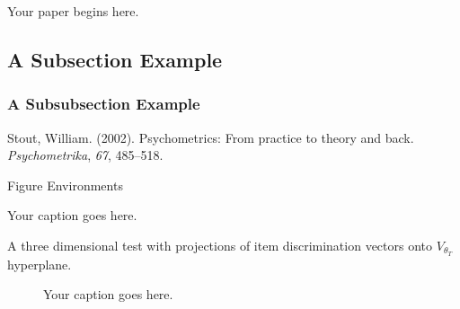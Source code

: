 \documentclass{pmet}
\begin{document}
Your paper begins here.

\subsection{A Subsection Example}

\subsubsection{A Subsubsection Example}


\begin{thebibliography}

\item Stout, William. (2002). Psychometrics: From practice to theory and back. \textit{Psychometrika}, \textit{67}, 485--518.

\end{thebibliography}

\bigskip

\centerline{Figure Environments}

\medskip

\begin{manfigure}
\caption{Your caption goes here.}
\end{manfigure}

\figskip

\begin{manfigure}
\caption{A three dimensional test with projections of item discrimination vectors onto $V_{\theta_T}$ hyperplane.}
\end{manfigure}



\begin{figure}[h]
\caption{Your caption goes here.}
\end{figure}

\vspace{\fill}

\end{document}
